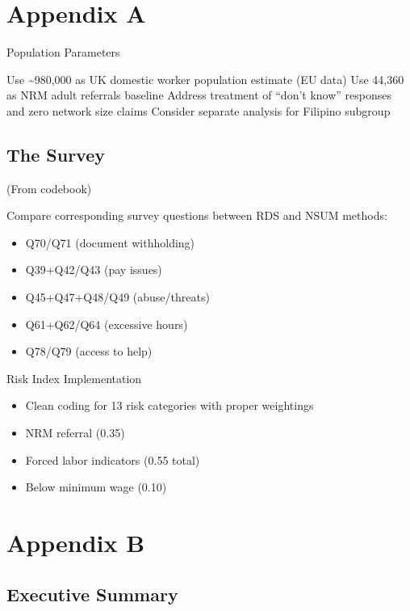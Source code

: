 \documentclass[
  12pt,
  letterpaper,
  DIV=11,
  numbers=noendperiod]{scrartcl}
\providecommand{\tightlist}{%
  \setlength{\itemsep}{0pt}\setlength{\parskip}{0pt}}
\theoremstyle{plain}
\theoremstyle{definition}
\begin{document}
\printbibliography[heading=none]

\newpage

\appendix

\section{Appendix A}\label{appendix-a}

Population Parameters

Use \textasciitilde980,000 as UK domestic worker population estimate (EU
data) Use 44,360 as NRM adult referrals baseline Address treatment of
``don't know'' responses and zero network size claims Consider separate
analysis for Filipino subgroup

\subsection{The Survey}\label{the-survey}

(From codebook)

Compare corresponding survey questions between RDS and NSUM methods:

\begin{itemize}
\tightlist
\item
  Q70/Q71 (document withholding)
\item
  Q39+Q42/Q43 (pay issues)
\item
  Q45+Q47+Q48/Q49 (abuse/threats)
\item
  Q61+Q62/Q64 (excessive hours)
\item
  Q78/Q79 (access to help)
\end{itemize}

Risk Index Implementation

\begin{itemize}
\tightlist
\item
  Clean coding for 13 risk categories with proper weightings
\item
  NRM referral (0.35)
\item
  Forced labor indicators (0.55 total)
\item
  Below minimum wage (0.10)
\end{itemize}

\section{Appendix B}\label{appendix-b}

\subsection{Executive Summary}\label{executive-summary}
\end{document}
